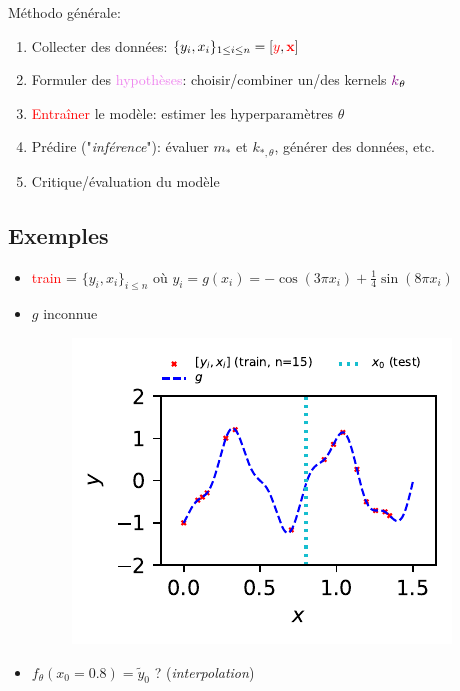 \documentclass[xcolor=svgnames, t]{beamer}
\newcommand{\vectorx}[1]{\boldsymbol{\MakeLowercase{\mathbf{#1}}}}
\newcommand{\coloredemph}[1]{\textcolor{internationalblue}{\emph{#1}}}
\newcommand{\tored}[1]{\textcolor{red}{#1}}
\newcommand{\toblue}[1]{\textcolor{internationalblue}{#1}}
\newcommand{\topurple}[1]{\textcolor{violet}{#1}}
\begin{document}
\begin{frame}\frametitle{\secname}
  Méthodo générale:
  \begin{enumerate}
    \item Collecter des données: $\{y_i, x_i\}_{1 \leq i \leq n} = [\tored{y}, \tored{\vectorx{x}}]$
    \pause
    \item Formuler des \topurple{hypothèses}: choisir/combiner un/des kernels $\topurple{k}_{\theta}$
    \pause
    \item \tored{Entraîner} le modèle: estimer les hyperparamètres $\theta$
    \pause
    \item \toblue{Prédire} ("\emph{inférence}"): évaluer $m_*$ et $k_{*, \theta}$, générer des données, etc.
    \pause
    \item Critique/évaluation du modèle
  \end{enumerate}
\end{frame}

\subsection{Exemples}
\begin{frame}{\subsecname}
  \begin{itemize}
    \item\tored{train} = $\{y_i, x_i\}_{i \leq n}$ où $y_i = g(x_i) = - \cos(3 \pi x_i) + \frac{1}{4} \sin(8 \pi x_i)$
    \item $g$ inconnue
      \begin{figure}
        \includegraphics{gp_1D_example_noisefree_data.pdf}
      \end{figure}
    \item $f_\theta(x_0 = 0.8) = \tilde{y}_0$ ? (\coloredemph{interpolation})
  \end{itemize}
\end{frame}
\end{document}
